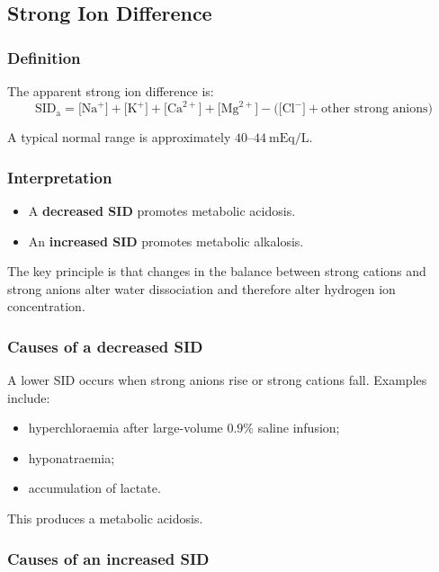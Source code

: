 \documentclass[11pt,a4paper]{article}
\begin{document}
\subsection{Strong Ion Difference}

\subsubsection{Definition}

The apparent strong ion difference is:
\[
\mathrm{SID_a} =
\bigl[\mathrm{Na}^+\bigr] + \bigl[\mathrm{K}^+\bigr] + \bigl[\mathrm{Ca}^{2+}\bigr] + \bigl[\mathrm{Mg}^{2+}\bigr]
-
\bigl(\bigl[\mathrm{Cl}^-\bigr] + \text{other strong anions}\bigr)
\]

A typical normal range is approximately \(40\text{--}44~\mathrm{mEq/L}\).

\subsubsection{Interpretation}

\begin{itemize}
    \item A \textbf{decreased SID} promotes metabolic acidosis.
    \item An \textbf{increased SID} promotes metabolic alkalosis.
\end{itemize}

The key principle is that changes in the balance between strong cations and strong anions alter water dissociation and therefore alter hydrogen ion concentration.

\subsubsection{Causes of a decreased SID}

A lower SID occurs when strong anions rise or strong cations fall. Examples include:
\begin{itemize}
    \item hyperchloraemia after large-volume \(0.9\%\) saline infusion;
    \item hyponatraemia;
    \item accumulation of lactate.
\end{itemize}

This produces a metabolic acidosis.

\subsubsection{Causes of an increased SID}
\end{document}
